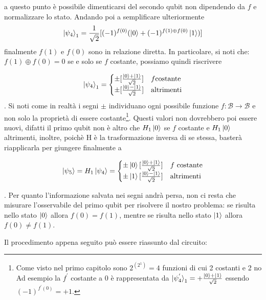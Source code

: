 \documentclass[12pt,a4paper,openright]{report}
\newcommand*\xor{\mathbin{\oplus}}
\begin{document}
\noindent a questo punto è possibile dimenticarsi del secondo qubit non dipendendo da $f$ e normalizzare lo stato. Andando poi a semplificare ulteriormente
\[
   \ket{\psi_4}_1 = \frac{1}{\sqrt2}[(-1)^{f(0)}(\ket0 + (-1)^{f(1) \xor f(0)}\ket{1} )]
\]
finalmente $f(1)$ e $ f(0)$ sono in relazione diretta. In particolare, si noti che: $f(1) \xor f(0)= 0$ se e solo se $f$ costante, possiamo quindi riscrivere

\[
    \ket{\psi_4}_1 =
    \begin{cases} 
        \pm [\frac{\ket0 + \ket1}{\sqrt2}] & f \text{costante}\\
        \pm [\frac{\ket0 - \ket1}{\sqrt2}] & \text{altrimenti}
    \end{cases}
 \]
 . Si noti come in realtà i segni $\pm$ individuano ogni possibile funzione $f:\mathcal{B}\rightarrow \mathcal{B}$ e non solo la proprietà di essere costante\footnote{Come visto nel primo capitolo sono $2^{(2^1)}=4$ funzioni di cui 2 costanti e 2 no Ad esempio la  $f^{'}$ costante a 0 è rappresentata da $ \ket{\psi_4^{'}}_1 = + \frac{\ket0 + \ket1}{\sqrt2}$ essendo $(-1)^{f^{'}(0)} = +1$.}.
 Questi valori non dovrebbero poi essere nuovi, difatti il primo qubit non è altro che $H_1\ket0$ se $f$ costante e $H_1\ket0$ altrimenti, inoltre, poichè H è la trasformazione inversa di se stessa, basterà riapplicarla
 per giungere finalmente a
 
 \[
    \ket{\psi_5} = H_1\ket{\psi_4} = 
    \begin{cases} 
        \pm \ket0[\frac{\ket0 + \ket1}{\sqrt2}] & f \text{ costante}\\
        \pm \ket1[\frac{\ket0 - \ket1}{\sqrt2}] & \text{altrimenti}
    \end{cases}
 \]
 
 . Per quanto l'informazione salvata nei segni andrà persa, non ci resta che misurare l'osservabile del primo qubit per risolvere il nostro problema: se risulta nello stato $\ket0$ allora $f(0)=f(1)$, mentre se risulta nello stato  $\ket1$ allora $f(0) \neq f(1)$.\par
 Il procedimento appena seguito può essere riassunto dal circuito:
\end{document}
